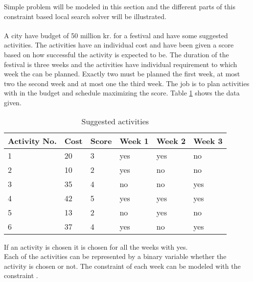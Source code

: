 Simple problem will be modeled in this section and the different parts of this constraint based local search solver 
will be illustrated. \\
 \\ 
A city have budget of 50 million kr. for a festival and have some suggested activities. The activities have 
an individual cost and have been given a score based on how successful the activity is expected to be. The duration of 
the festival is three weeks and the activities have individual requirement to which week the can be planned. Exactly 
two must be planned the first week, at most two the second week and at most one the third week. The job is to 
plan activities with in the budget and schedule maximizing the score. Table \ref{tab_activity} shows the data given. \\
\begin{table}[b]
\centering
\begin{tabular}{|l|l|l|l|l|l|}
\hline
Activity No. & Cost & Score & Week 1 & Week 2 & Week 3 \\ \hline
1            & 20   & 3     & yes    & yes    & no     \\ \hline
2            & 10   & 2     & yes    & no     & no     \\ \hline
3            & 35   & 4     & no     & no     & yes    \\ \hline
4            & 42   & 5     & yes    & yes    & yes    \\ \hline
5            & 13   & 2     & no     & yes    & no     \\ \hline
6            & 37   & 4     & yes    & no     & yes    \\ \hline
\end{tabular}
\caption{Suggested activities}
\label{tab_activity}
\end{table} \noindent
If an activity is chosen it is chosen for all the weeks with yes. \\ 
Each of the activities can be represented by a binary variable whether the activity is chosen or not. The constraint of 
each week can be modeled with the  constraint . 